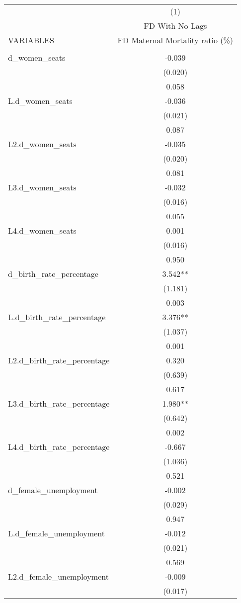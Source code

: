 \begin{tabular}{lc} \hline
 & (1) \\
 & FD With No Lags \\
VARIABLES & FD Maternal Mortality ratio (\%) \\ \hline
 &  \\
d\_women\_seats & -0.039 \\
 & (0.020) \\
 & 0.058 \\
L.d\_women\_seats & -0.036 \\
 & (0.021) \\
 & 0.087 \\
L2.d\_women\_seats & -0.035 \\
 & (0.020) \\
 & 0.081 \\
L3.d\_women\_seats & -0.032 \\
 & (0.016) \\
 & 0.055 \\
L4.d\_women\_seats & 0.001 \\
 & (0.016) \\
 & 0.950 \\
d\_birth\_rate\_percentage & 3.542** \\
 & (1.181) \\
 & 0.003 \\
L.d\_birth\_rate\_percentage & 3.376** \\
 & (1.037) \\
 & 0.001 \\
L2.d\_birth\_rate\_percentage & 0.320 \\
 & (0.639) \\
 & 0.617 \\
L3.d\_birth\_rate\_percentage & 1.980** \\
 & (0.642) \\
 & 0.002 \\
L4.d\_birth\_rate\_percentage & -0.667 \\
 & (1.036) \\
 & 0.521 \\
d\_female\_unemployment & -0.002 \\
 & (0.029) \\
 & 0.947 \\
L.d\_female\_unemployment & -0.012 \\
 & (0.021) \\
 & 0.569 \\
L2.d\_female\_unemployment & -0.009 \\
 & (0.017) \\

\end{tabular}
